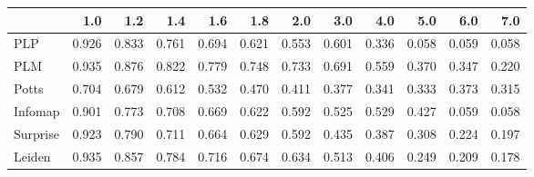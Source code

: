 \begin{tabular}{lrrrrrrrrrrr}
\toprule
{} &   1.0 &   1.2 &   1.4 &   1.6 &   1.8 &   2.0 &   3.0 &   4.0 &   5.0 &   6.0 &   7.0 \\
\midrule
PLP      & 0.926 & 0.833 & 0.761 & 0.694 & 0.621 & 0.553 & 0.601 & 0.336 & 0.058 & 0.059 & 0.058 \\
PLM      & 0.935 & 0.876 & 0.822 & 0.779 & 0.748 & 0.733 & 0.691 & 0.559 & 0.370 & 0.347 & 0.220 \\
Potts    & 0.704 & 0.679 & 0.612 & 0.532 & 0.470 & 0.411 & 0.377 & 0.341 & 0.333 & 0.373 & 0.315 \\
Infomap  & 0.901 & 0.773 & 0.708 & 0.669 & 0.622 & 0.592 & 0.525 & 0.529 & 0.427 & 0.059 & 0.058 \\
Surprise & 0.923 & 0.790 & 0.711 & 0.664 & 0.629 & 0.592 & 0.435 & 0.387 & 0.308 & 0.224 & 0.197 \\
Leiden   & 0.935 & 0.857 & 0.784 & 0.716 & 0.674 & 0.634 & 0.513 & 0.406 & 0.249 & 0.209 & 0.178 \\
\bottomrule
\end{tabular}

